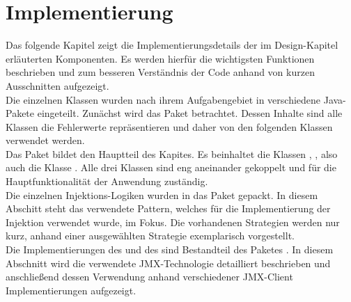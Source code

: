 \label{Implementierung}
\chapter{Implementierung}\vspace{1cm}
Das folgende Kapitel zeigt die Implementierungsdetails der im Design-Kapitel erläuterten Komponenten. Es werden hierfür die wichtigsten Funktionen beschrieben und zum besseren Verständnis der Code anhand von kurzen Ausschnitten aufgezeigt.\\
Die einzelnen Klassen wurden nach ihrem Aufgabengebiet in verschiedene Java-Pakete eingeteilt. Zunächst wird das Paket  betrachtet. Dessen Inhalte sind alle Klassen die Fehlerwerte repr\"asentieren und daher von den folgenden Klassen verwendet werden.\\
Das Paket  bildet den Hauptteil des Kapites. Es beinhaltet die Klassen  , , also auch die Klasse . Alle drei Klassen sind eng aneinander gekoppelt und für die Hauptfunktionalität der Anwendung zuständig. \\
Die einzelnen Injektions-Logiken wurden in das Paket  gepackt. In diesem Abschitt steht das verwendete Pattern, welches für die Implementierung der Injektion verwendet wurde, im Fokus. Die vorhandenen Strategien werden nur kurz, anhand einer ausgewählten Strategie exemplarisch vorgestellt.\\
Die Implementierungen des  und des  sind Bestandteil des Paketes . In diesem Abschnitt wird die verwendete JMX-Technologie detailliert beschrieben und anschlie\ss end dessen Verwendung anhand verschiedener JMX-Client Implementierungen aufgezeigt.





%

%



%
%
%
%
%
%

